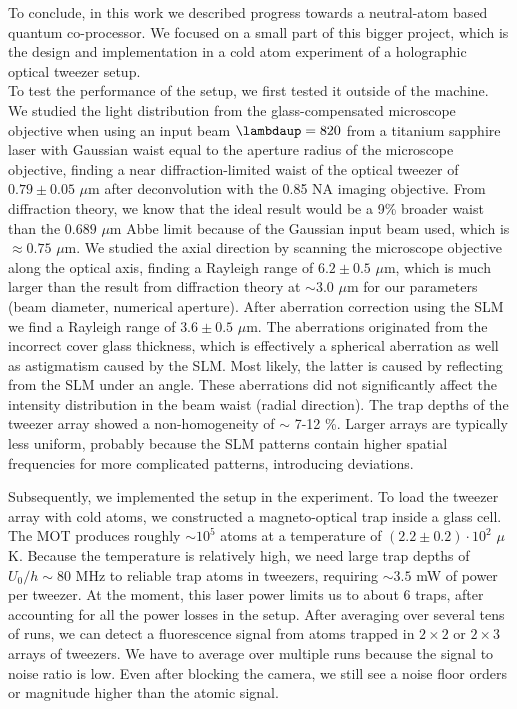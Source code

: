 To conclude, in this work we described progress towards a neutral-atom based quantum co-processor. 
We focused on a small part of this bigger project, which is the design and implementation in a cold atom experiment of a holographic optical tweezer setup. \\

\noindent To test the performance of the setup, we first tested it outside of the machine.
We studied the light distribution from the glass-compensated microscope objective when using an input beam $\lambdaup = 820$ from a titanium sapphire laser with Gaussian waist equal to the aperture radius of the microscope objective, finding a near diffraction-limited waist of the optical tweezer of $0.79 \pm 0.05$ $\mu$m after deconvolution with the 0.85 NA imaging objective. 
From diffraction theory, we know that the ideal result would be a 9\% broader waist than the $0.689$ $\mu$m Abbe limit because of the Gaussian input beam used, which is $\approx 0.75$ $\mu$m.
We studied the axial direction by scanning the microscope objective along the optical axis, finding a Rayleigh range of $6.2\pm0.5$ $\mu$m, which is much larger than the result from diffraction theory at $\sim 3.0$ $\mu$m for our parameters (beam diameter, numerical aperture). 
After aberration correction using the SLM we find a Rayleigh range of $3.6 \pm 0.5$ $\mu$m.
The aberrations originated from the incorrect cover glass thickness, which is effectively a spherical aberration as well as astigmatism caused by the SLM.
Most likely, the latter is caused by reflecting from the SLM under an angle.
These aberrations did not significantly affect the intensity distribution in the beam waist (radial direction).
The trap depths of the tweezer array showed a non-homogeneity of $\sim$ 7-12 \%.
Larger arrays are typically less uniform, probably because the SLM patterns contain higher spatial frequencies for more complicated patterns, introducing deviations. 

Subsequently, we implemented the setup in the experiment.
To load the tweezer array with cold atoms, we constructed a magneto-optical trap inside a glass cell. 
The MOT produces roughly $\sim10^5$ atoms at a temperature of $(2.2 \pm 0.2) \cdot 10^2$ $\mu$K.
Because the temperature is relatively high, we need large trap depths of $U_0/h \sim 80$ MHz to reliable trap atoms in tweezers, requiring $\sim 3.5$ mW of power per tweezer.
At the moment, this laser power limits us to about 6 traps, after accounting for all the power losses in the setup. 
After averaging over several tens of runs, we can detect a fluorescence signal from atoms trapped in $2\times 2$ or $2\times 3$ arrays of tweezers. 
We have to average over multiple runs because the signal to noise ratio is low.
Even after blocking the camera, we still see a noise floor orders or magnitude higher than the atomic signal. \\

